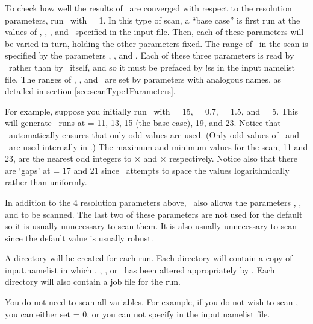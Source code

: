 To check how well the results of \sfincs~are converged with respect to the resolution
parameters, run \sfincsScan~with  = 1.
In this type of scan, a ``base case'' is first run at the
values of \Ntheta, \Nzeta, \Nxi, and \Nx~specified in the input file.
Then, each of these parameters will be varied in turn, holding the other parameters fixed.
The range of \Ntheta~in the scan is specified by the parameters ,
, and . 
Each of these three parameters is read by \sfincsScan~rather than by \sfincs~itself,
and so it must be prefaced by {\ttfamily !ss} in the input namelist file.
The ranges of \Nzeta, \Nxi, and \Nx~are set by parameters with analogous names,
as detailed in section \ref{sec:scanType1Parameters}.

For example, suppose you initially run \sfincsScan~with \Ntheta = 15, 
 = 0.7,  = 1.5, and 
 = 5.
This will generate \sfincs~runs at \Ntheta = 11, 13, 15 (the base case), 19, and 23.
Notice that \sfincsScan~automatically ensures that only odd values are used.
(Only odd values of \Ntheta~and \Nzeta~are used internally in \sfincs.)
The maximum and minimum values for the scan, 11 and 23, are the nearest odd integers
to \Ntheta$\times$ and \Ntheta$\times$ respectively.
Notice also that there are `gaps' at  \Ntheta = 17 and 21 since \sfincsScan~attempts to space the values
logarithmically rather than uniformly.

In addition to the 4 resolution parameters above, \sfincsScan~also allows the parameters
, , and 
to be scanned.  The last two of these parameters are not used for the default 
so it is usually unnecessary to scan them.  It is also usually unnecessary to scan 
since the default value is usually robust.

A directory will be created for each run.  Each directory will contain
a copy of {\ttfamily input.namelist} in which \Ntheta, \Nzeta, \Nx, or \Nxi~has been
altered appropriately by \sfincsScan. Each directory will also contain a job file for the run.

You do not need to scan all variables. For example, if you do not wish to scan \Nx,
you can either set  = 0, or you can not specify
 in the {\ttfamily input.namelist} file.

